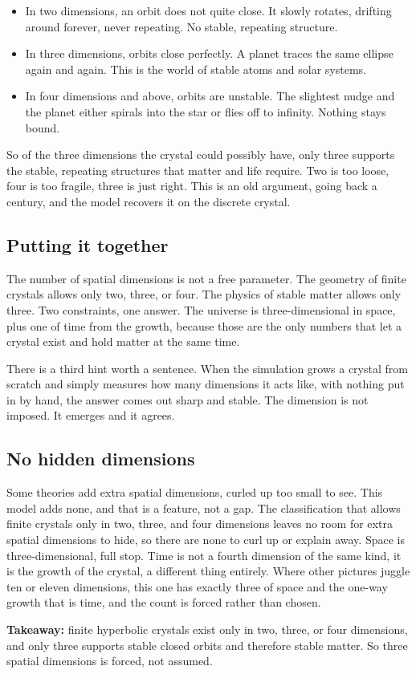 \begin{itemize}
\item In two dimensions, an orbit does not quite close. It slowly rotates, drifting around forever, never repeating. No stable, repeating structure.
\item In three dimensions, orbits close perfectly. A planet traces the same ellipse again and again. This is the world of stable atoms and solar systems.
\item In four dimensions and above, orbits are unstable. The slightest nudge and the planet either spirals into the star or flies off to infinity. Nothing stays bound.
\end{itemize}

So of the three dimensions the crystal could possibly have, only three supports the stable, repeating structures that matter and life require. Two is too loose, four is too fragile, three is just right. This is an old argument, going back a century, and the model recovers it on the discrete crystal.

\subsection{Putting it together}

The number of spatial dimensions is not a free parameter. The geometry of finite crystals allows only two, three, or four. The physics of stable matter allows only three. Two constraints, one answer. The universe is three-dimensional in space, plus one of time from the growth, because those are the only numbers that let a crystal exist and hold matter at the same time.

There is a third hint worth a sentence. When the simulation grows a crystal from scratch and simply measures how many dimensions it acts like, with nothing put in by hand, the answer comes out sharp and stable. The dimension is not imposed. It emerges and it agrees.

\subsection{No hidden dimensions}

Some theories add extra spatial dimensions, curled up too small to see. This model adds none, and that is a feature, not a gap. The classification that allows finite crystals only in two, three, and four dimensions leaves no room for extra spatial dimensions to hide, so there are none to curl up or explain away. Space is three-dimensional, full stop. Time is not a fourth dimension of the same kind, it is the growth of the crystal, a different thing entirely. Where other pictures juggle ten or eleven dimensions, this one has exactly three of space and the one-way growth that is time, and the count is forced rather than chosen.

\textbf{Takeaway:} finite hyperbolic crystals exist only in two, three, or four dimensions, and only three supports stable closed orbits and therefore stable matter. So three spatial dimensions is forced, not assumed.
